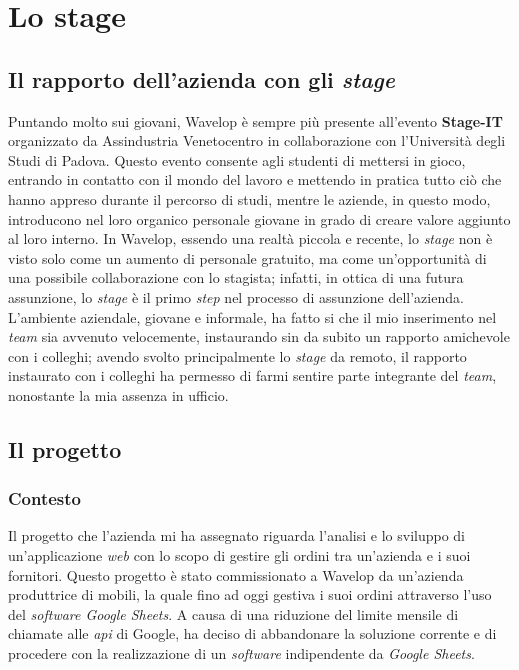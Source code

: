 
\chapter{Lo stage}
\label{cap:stage}
\section{Il rapporto dell'azienda con gli \emph{stage}}
Puntando molto sui giovani, Wavelop è sempre più presente all'evento \textbf{Stage-IT} organizzato da Assindustria Venetocentro in collaborazione con l'Università degli Studi di Padova.
Questo evento consente agli studenti di mettersi in gioco, entrando in contatto con il mondo del lavoro e mettendo in pratica tutto ciò che hanno appreso durante il percorso di studi, mentre le aziende, in questo modo, introducono nel loro organico personale giovane in grado di creare valore aggiunto al loro interno.
In Wavelop, essendo una realtà piccola e recente, lo \emph{stage} non è visto solo come un aumento di personale gratuito, ma come un'opportunità di una possibile collaborazione con lo stagista; infatti, in ottica di una futura assunzione, lo \emph{stage} è il primo \emph{step} nel processo di assunzione dell'azienda. 
L'ambiente aziendale, giovane e informale, ha fatto si che il mio inserimento nel \emph{team} sia avvenuto velocemente, instaurando sin da subito un rapporto amichevole con i colleghi; avendo svolto principalmente lo \emph{stage} da remoto, il rapporto instaurato con i colleghi ha permesso di farmi sentire parte integrante del \emph{team}, nonostante la mia assenza in ufficio.

\section{Il progetto}

\subsection{Contesto}
Il progetto che l'azienda mi ha assegnato riguarda l'analisi e lo sviluppo di un'applicazione \emph{web} con lo scopo di gestire gli ordini tra un'azienda e i suoi fornitori.
Questo progetto è stato commissionato a Wavelop da un'azienda produttrice di mobili, la quale fino ad oggi gestiva i suoi ordini attraverso l'uso del \emph{software Google Sheets}. 
A causa di una riduzione del limite mensile di chiamate alle \emph{\acrshort{api}} di Google, ha deciso di abbandonare la soluzione corrente e di procedere con la realizzazione di un \emph{software} indipendente da \emph{Google Sheets}. \\

